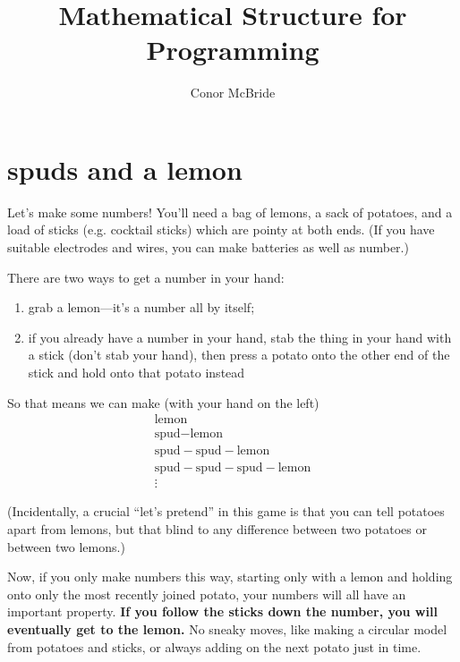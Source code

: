 \documentclass{book}
\begin{document}
\newtheorem{puz}{Puzzle}[chapter]


\title{Mathematical Structure for Programming}
\author{Conor McBride}
\maketitle


\chapter{spuds and a lemon}

Let's make some numbers! You'll need a bag of lemons, a sack of potatoes, and a load of sticks (e.g. cocktail sticks) which are pointy at both ends. (If you have suitable electrodes and wires, you can make batteries as well as number.)

There are two ways to get a number in your hand:
\begin{enumerate}
\item grab a lemon---it's a number all by itself;
  \item if you already have a number in your hand, stab the thing in your hand with a stick (don't stab your hand), then press a potato onto the other end of the stick and hold onto that potato instead
\end{enumerate}

\newcommand{\spud}{\mbox{spud}\!\!\!-\!\!\!}
\newcommand{\lemon}{\mbox{lemon}}
So that means we can make (with your hand on the left)
\[\begin{array}{l}
\lemon\\
\spud\lemon\\
\spud\spud\lemon\\
\spud\spud\spud\lemon\\
\vdots
\end{array}\]

(Incidentally, a crucial ``let's pretend'' in this game is that you can tell potatoes apart from lemons, but that blind to any difference between two potatoes or between two lemons.)

Now, if you only make numbers this way, starting only with a lemon and holding onto only the most recently joined potato, your numbers will all have an important property. \textbf{If you follow the sticks down the number, you will eventually get to the lemon.} No sneaky moves, like making a circular model from potatoes and sticks, or always adding on the next potato just in time.
\end{document}
